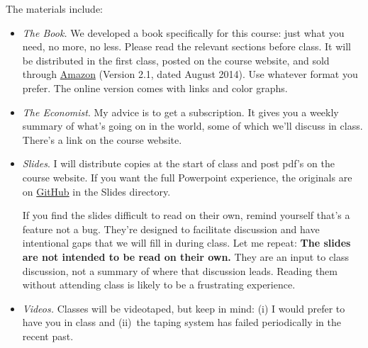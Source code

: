 \documentclass[12pt]{article}
\begin{document}
The materials include:
%
\begin{itemize}
\item {\it The Book.\/}
We developed a book specifically for this course:
just what you need, no more, no less.
Please read the relevant sections before class.
It will be distributed in the first class,
posted on the course website,
and sold through
\href{http://www.amazon.com/dp/1500837105/}{Amazon}
(Version 2.1, dated August 2014).
Use whatever format you prefer.
The online version comes with links and color graphs.



\item {\it The Economist\/}.
My advice is to get a subscription.
It gives you a weekly summary of what's going on in the world,
some of which we'll discuss in class.
There's a link on the course website.

\item {\it Slides\/}.
I will distribute copies at the start of class and post pdf's on the course website.
If you want the full Powerpoint experience, the originals are on
\href{https://github.com/DaveBackus/Global_Economy}{GitHub} in the Slides directory.

If you find the slides difficult to read on their own,
remind yourself that's a feature not a bug.
They're designed to facilitate discussion
and have intentional gaps that we will fill in during class.
Let me repeat: {\bf The slides are not intended to be read on their own.}
They are an input to class discussion, not a summary of where that discussion
leads.
Reading them without attending class is likely to be a frustrating experience.

\item {\it Videos.\/}
Classes will be videotaped, but keep in mind:
(i) I would prefer to have you in class and
(ii)~the taping system has failed periodically in the recent past.

\end{itemize}
\end{document}
